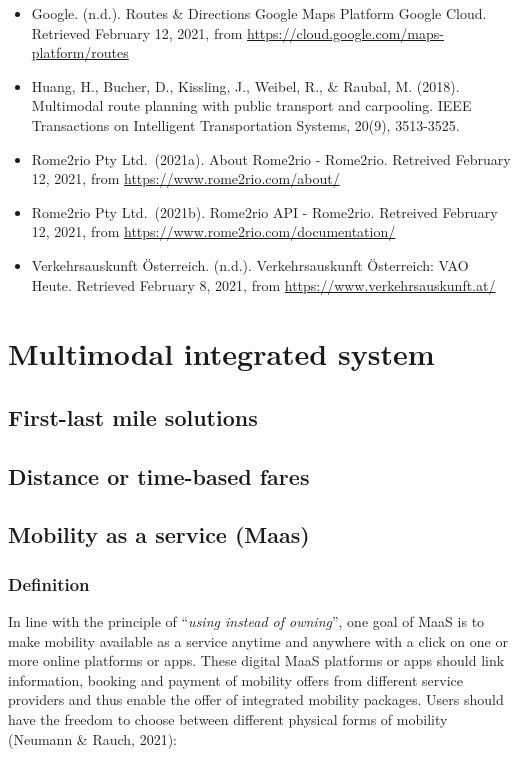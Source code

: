\documentclass[
]{book}
\begin{document}
\begin{itemize}
\item
  Google. (n.d.). Routes \& Directions \textbar{} Google Maps Platform \textbar{} Google Cloud. Retrieved February 12, 2021, from \url{https://cloud.google.com/maps-platform/routes}
\item
  Huang, H., Bucher, D., Kissling, J., Weibel, R., \& Raubal, M. (2018). Multimodal route planning with public transport and carpooling. IEEE Transactions on Intelligent Transportation Systems, 20(9), 3513-3525.
\item
  Rome2rio Pty Ltd.~(2021a). About Rome2rio - Rome2rio. Retreived February 12, 2021, from \url{https://www.rome2rio.com/about/}
\item
  Rome2rio Pty Ltd.~(2021b). Rome2rio API - Rome2rio. Retreived February 12, 2021, from \url{https://www.rome2rio.com/documentation/}
\item
  Verkehrsauskunft Österreich. (n.d.). Verkehrsauskunft Österreich: VAO Heute. Retrieved February 8, 2021, from \url{https://www.verkehrsauskunft.at/}
\end{itemize}

\hypertarget{multimodal}{%
\chapter{Multimodal integrated system}\label{multimodal}}

\hypertarget{flms}{%
\section{First-last mile solutions}\label{flms}}

\hypertarget{dist_time_fares}{%
\section{Distance or time-based fares}\label{dist_time_fares}}

\hypertarget{maas}{%
\section{Mobility as a service (Maas)}\label{maas}}

\hypertarget{definition-16}{%
\subsection*{Definition}\label{definition-16}}

In line with the principle of ``\emph{using instead of owning}'', one goal of MaaS is to make mobility available as a service anytime and anywhere with a click on one or more online platforms or apps. These digital MaaS platforms or apps should link information, booking and payment of mobility offers from different service providers and thus enable the offer of integrated mobility packages. Users should have the freedom to choose between different physical forms of mobility (Neumann \& Rauch, 2021):
\end{document}
